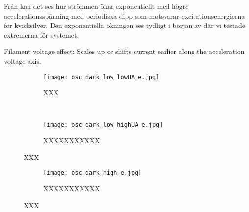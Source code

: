 Från  kan det ses hur strömmen ökar exponentiellt med högre accelerationsspänning med periodiska dipp som motsvarar excitationsenergierna för kvicksilver. Den exponentiella ökningen ses tydligt i början av  där vi testade extremerna för systemet.

Filament voltage effect:
Scales up or shifts current earlier along the acceleration voltage axis.

\begin{figure}[h]
	\centering
	\begin{subfigure}[c]{0.47\textwidth}
	\texttt{[image: osc\_dark\_low\_lowUA\_e.jpg]}
	\caption{XXX}
	\label{fig:dark_lowub}
	\end{subfigure}
	~
	\begin{subfigure}[c]{0.47\textwidth}
	\texttt{[image: osc\_dark\_low\_highUA\_e.jpg]}
	\caption{XXXXXXXXXXX}
	\label{fig:dark_highub}
	\end{subfigure}
	\caption{XXX}\label{fig:hgstuff}
	
	\begin{subfigure}[c]{0.47\textwidth}
	\texttt{[image: osc\_dark\_high\_e.jpg]}
	\caption{XXXXXXXXXXX}
	\label{fig:dark_high}
	\end{subfigure}
	\caption{XXX}\label{fig:hgstuff}
\end{figure}

